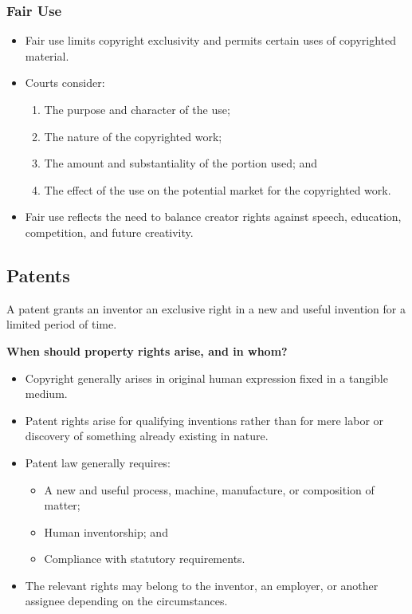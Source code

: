 \documentclass[11pt]{tex/lawoutline}
\begin{document}
\subsubsection{Fair Use}{
\begin{itemize}
    \item Fair use limits copyright exclusivity and permits certain uses of copyrighted material.
    \item Courts consider:
    \begin{enumerate}
        \item The purpose and character of the use;
        \item The nature of the copyrighted work;
        \item The amount and substantiality of the portion used; and
        \item The effect of the use on the potential market for the copyrighted work.
    \end{enumerate}
    \item Fair use reflects the need to balance creator rights against speech, education, competition, and future creativity.
\end{itemize}
}

\subsection{Patents}

{
A patent grants an inventor an exclusive right in a new and useful invention for a limited period of time.
}

\textbf{When should property rights arise, and in whom?}
{
\begin{itemize}
    \item Copyright generally arises in original human expression fixed in a tangible medium.
    \item Patent rights arise for qualifying inventions rather than for mere labor or discovery of something already existing in nature.
    \item Patent law generally requires:
    \begin{itemize}
        \item A new and useful process, machine, manufacture, or composition of matter;
        \item Human inventorship; and
        \item Compliance with statutory requirements.
    \end{itemize}
    \item The relevant rights may belong to the inventor, an employer, or another assignee depending on the circumstances.
\end{itemize}
}
\end{document}
